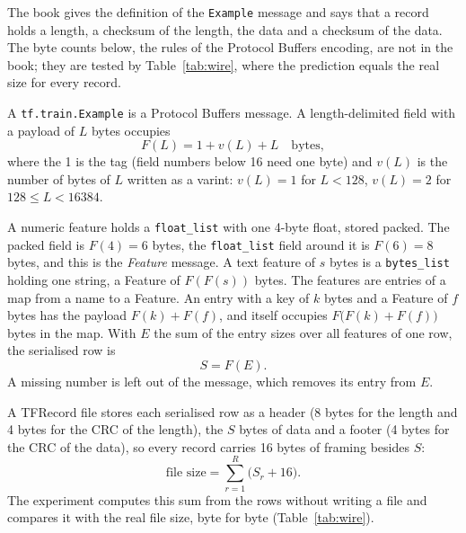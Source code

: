 The book gives the definition of the \texttt{Example} message and says that a record holds a length, a checksum of the length, the data and a checksum of the data. The byte counts below, the rules of the Protocol Buffers encoding, are not in the book; they are tested by Table~\ref{tab:wire}, where the prediction equals the real size for every record.

A \texttt{tf.train.Example} is a Protocol Buffers message. A length-delimited field with a payload of $L$ bytes occupies
\begin{equation}
F(L) = 1 + v(L) + L \quad\text{bytes},
\end{equation}
where the 1 is the tag (field numbers below 16 need one byte) and $v(L)$ is the number of bytes of $L$ written as a varint: $v(L) = 1$ for $L < 128$, $v(L) = 2$ for $128 \le L < 16384$.

A numeric feature holds a \texttt{float\_list} with one 4-byte float, stored packed. The packed field is $F(4) = 6$ bytes, the \texttt{float\_list} field around it is $F(6) = 8$ bytes, and this is the \emph{Feature} message. A text feature of $s$ bytes is a \texttt{bytes\_list} holding one string, a Feature of $F(F(s))$ bytes. The features are entries of a map from a name to a Feature. An entry with a key of $k$ bytes and a Feature of $f$ bytes has the payload $F(k) + F(f)$, and itself occupies $F\bigl(F(k) + F(f)\bigr)$ bytes in the map. With $E$ the sum of the entry sizes over all features of one row, the serialised row is
\begin{equation}
S = F(E) .
\end{equation}
A missing number is left out of the message, which removes its entry from $E$.

A TFRecord file stores each serialised row as a header (8 bytes for the length and 4 bytes for the CRC of the length), the $S$ bytes of data and a footer (4 bytes for the CRC of the data), so every record carries 16 bytes of framing besides $S$:
\begin{equation}
\text{file size} = \sum_{r=1}^{R} \bigl(S_r + 16\bigr) .
\end{equation}
The experiment computes this sum from the rows without writing a file and compares it with the real file size, byte for byte (Table~\ref{tab:wire}).

